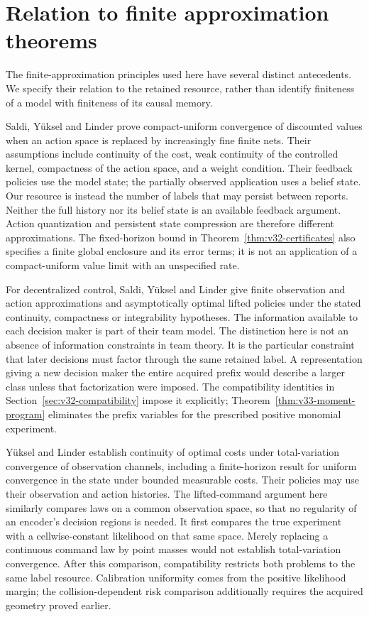 \section{Relation to finite approximation theorems}
\label{sec:v33-comparison}
The finite-approximation principles used here have several distinct
antecedents. We specify their relation to the retained resource, rather
than identify finiteness of a model with finiteness of its causal memory.

Saldi, Y\"uksel and Linder \cite[Assumption 3.1 and Theorem 3.2]{SYLWeak2016}
prove compact-uniform convergence of discounted values when an action
space is replaced by increasingly fine finite nets. Their assumptions
include continuity of the cost, weak continuity of the controlled kernel,
compactness of the action space, and a weight condition. Their feedback
policies use the model state; the partially observed application uses
a belief state. Our resource is instead the number of labels that may
persist between reports. Neither the full history nor its belief state
is an available feedback argument. Action quantization and persistent
state compression are therefore different approximations. The
fixed-horizon bound in Theorem~\ref{thm:v32-certificates} also specifies
a finite global enclosure and its error terms; it is not an application
of a compact-uniform value limit with an unspecified rate.

For decentralized control, Saldi, Y\"uksel and Linder
\cite[Theorems 4, 5 and 11]{SYLTeams2015} give finite observation and
action approximations and asymptotically optimal lifted policies under
the stated continuity, compactness or integrability hypotheses. The
information available to each decision maker is part of their team
model. The distinction here is not an absence of information constraints
in team theory. It is the particular constraint that later decisions
must factor through the same retained label. A representation giving a
new decision maker the entire acquired prefix would describe a larger
class unless that factorization were imposed. The compatibility
identities in Section~\ref{sec:v32-compatibility} impose it explicitly;
Theorem~\ref{thm:v33-moment-program} eliminates the prefix variables
for the prescribed positive monomial experiment.

Y\"uksel and Linder \cite[Theorems 3.4 and 6.2]{YLChannels2012}
establish continuity of optimal costs under total-variation convergence
of observation channels, including a finite-horizon result for uniform
convergence in the state under bounded measurable costs. Their policies
may use their observation and action histories. The lifted-command
argument here similarly compares laws on a common observation space,
so that no regularity of an encoder's decision regions is needed. It
first compares the true experiment with a cellwise-constant likelihood
on that same space. Merely replacing a continuous command law by point
masses would not establish total-variation convergence. After this
comparison, compatibility restricts both problems to the same label
resource. Calibration uniformity comes from the positive likelihood
margin; the collision-dependent risk comparison additionally requires
the acquired geometry proved earlier.

